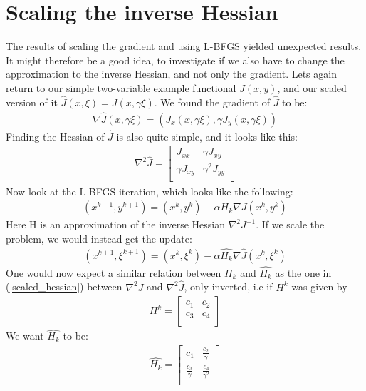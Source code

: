 \documentclass[11pt,a4paper]{article}
\begin{document}
\section{Scaling the inverse Hessian}
The results of scaling the gradient and using L-BFGS yielded unexpected results. It might therefore be a good idea, to investigate if we also have to change the approximation to the inverse Hessian, and not only the gradient. Lets again return to our simple two-variable example functional $J(x,y)$, and our scaled version of it $\hat{J}(x,\xi)=J(x,\gamma\xi)$. We found the gradient of $\hat{J}$ to be:
\begin{align*}
\nabla \hat{J}(x,\gamma\xi) = (J_x(x,\gamma\xi),\gamma J_y(x,\gamma\xi))
\end{align*}
Finding the Hessian of $\hat{J}$ is also quite simple, and it looks like this:
\begin{align}
  \nabla^2 \hat{J}=\left[ \begin{array}{cc}
   J_{xx} & \gamma J_{xy}\\
    \gamma J_{xy}& \gamma^2J_{yy}\\
   \end{array}  \right]  \label{scaled_hessian}  
\end{align}
Now look at the L-BFGS iteration, which looks like the following:
\begin{align*}
(x^{k+1},y^{k+1}) = (x^k,y^k) - \alpha H_k \nabla J(x^k,y^k)
\end{align*}
Here H is an approximation of the inverse Hessian $ \nabla^2 J^{-1}$. If we scale the problem, we would instead get the update:
\begin{align*}
(x^{k+1},\xi^{k+1}) = (x^k,\xi^k) - \alpha \hat{H_k} \nabla \hat{J}(x^k,\xi^k)
\end{align*}
One would now expect a similar relation between $H_k$ and $\hat{H_k}$ as the one in (\ref{scaled_hessian}) between $\nabla^2 J$ and $\nabla^2 \hat{J}$, only inverted, i.e if $H^k$ was given by
\begin{align*}
	H^k=\left[ \begin{array}{cc}
   	c_1 & c_2\\
    	c_3& c_4\\
   \end{array}  \right]
\end{align*}
We want  $\hat{H_k}$ to be:
\begin{align*}
	\hat{H_k}=\left[ \begin{array}{cc}
   	c_1 & \frac{c_2}{\gamma}\\
    	\frac{c_3}{\gamma}& \frac{c_4}{\gamma^2}\\
   \end{array}  \right]
\end{align*}
\end{document}
